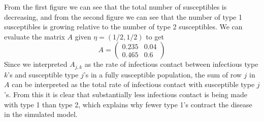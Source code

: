 \documentclass{article}
\begin{document}
\begin{enumerate}
\begin{enumerate}
\begin{figure}[H]
			\end{figure}
			From the first figure we can see that the total number of susceptibles is decreasing, and from the second figure we can see that the number of type 1 susceptibles is growing relative to the number of type 2 susceptibles.
			We can evaluate the matrix $A$ given $\eta = (1/2, 1/2)$ to get
			\[
			A=
			\begin{pmatrix}
				0.235 & 0.04 \\
				0.465 & 0.6
			\end{pmatrix}
			\] 
	Since we interpreted $A_{j,k}$ as the rate of infectious contact between infectious type $k$'s and susceptible type $j$'s in a fully susceptible population, the sum of row $j$ in $A$ can be interpreted as the total rate of infectious contact with susceptible type $j$'s. From this it is clear that substantially less infectious contact is being made with type 1 than type 2, which explains why fewer type 1's contract the disease in the simulated model.
	\end{enumerate}
\end{enumerate}
\end{document}
